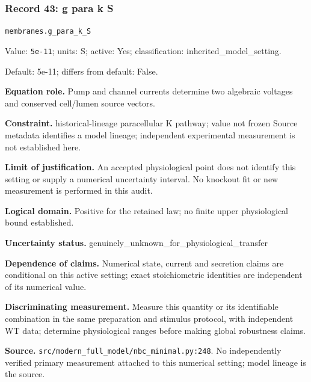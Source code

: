\subsubsection*{Record 43: g para k S}
{\small \nolinkurl{membranes.g_para_k_S}\par

Value: \texttt{5e-11}; units: S; active: Yes; classification: inherited\_model\_setting.\par

Default: 5e-11; differs from default: False.\par

\textbf{Equation role.} Pump and channel currents determine two algebraic voltages and conserved cell/lumen source vectors.\par

\textbf{Constraint.} historical-lineage paracellular K pathway; value not frozen Source metadata identifies a model lineage; independent experimental measurement is not established here.\par

\textbf{Limit of justification.} An accepted physiological point does not identify this setting or supply a numerical uncertainty interval. No knockout fit or new measurement is performed in this audit.\par

\textbf{Logical domain.} Positive for the retained law; no finite upper physiological bound established.\par

\textbf{Uncertainty status.} genuinely\_unknown\_for\_physiological\_transfer\par

\textbf{Dependence of claims.} Numerical state, current and secretion claims are conditional on this active setting; exact stoichiometric identities are independent of its numerical value.\par

\textbf{Discriminating measurement.} Measure this quantity or its identifiable combination in the same preparation and stimulus protocol, with independent WT data; determine physiological ranges before making global robustness claims.\par

\textbf{Source.} \nolinkurl{src/modern_full_model/nbc_minimal.py:248}. No independently verified primary measurement attached to this numerical setting; model lineage is the source.\par}

